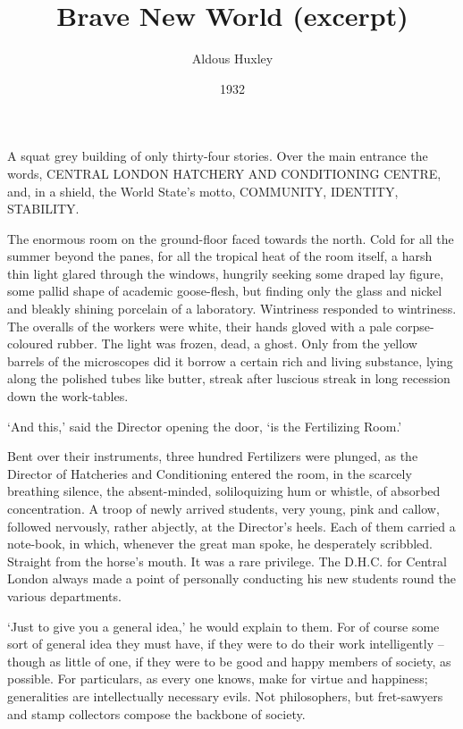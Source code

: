 \documentclass[10pt,a4paper]{article}
\newcommand{\sqm}[1]{‘#1’}
\begin{document}
\title{Brave New World (excerpt)}
\date{1932}
\author{Aldous Huxley}
\maketitle
    
\linenumbers A squat grey building of only thirty-four stories. Over the main entrance the words, CENTRAL LONDON HATCHERY AND CONDITIONING CENTRE, and, in a shield, the World State's motto, COMMUNITY, IDENTITY, STABILITY.

The enormous room on the ground-floor faced towards the north. Cold for all the summer beyond the panes, for all the tropical heat of the room itself, a harsh thin light glared through the windows, hungrily seeking some draped lay figure, some pallid shape of academic goose-flesh, but finding only the glass and nickel and bleakly shining porcelain of a laboratory. Wintriness responded to wintriness. The overalls of the workers were white, their hands gloved with a pale corpse-coloured rubber. The light was frozen, dead, a ghost. Only from the yellow barrels of the microscopes did it borrow a certain rich and living substance, lying along the polished tubes like butter, streak after luscious streak in long recession down the work-tables.

\sqm{And this,} said the Director opening the door, \sqm{is the Fertilizing Room.}

Bent over their instruments, three hundred Fertilizers were plunged, as the Director of Hatcheries and Conditioning entered the room, in the scarcely breathing silence, the absent-minded, soliloquizing hum or whistle, of absorbed concentration. A troop of newly arrived students, very young, pink and callow, followed nervously, rather abjectly, at the Director's heels. Each of them carried a note-book, in which, whenever the great man spoke, he desperately scribbled. Straight from the horse's mouth. It was a rare privilege. The D.H.C. for Central London always made a point of personally conducting his new students round the various departments.

\sqm{Just to give you a general idea,} he would explain to them. For of course some sort of general idea they must have, if they were to do their work intelligently – though as little of one, if they were to be good and happy members of society, as possible. For particulars, as every one knows, make for virtue and happiness; generalities are intellectually necessary evils. Not philosophers, but fret-sawyers and stamp collectors compose the backbone of society.
\end{document}
